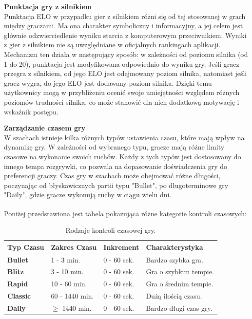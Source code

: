 \documentclass[12pt,a4paper]{article}
\begin{document}
\noindent \textbf{Punktacja gry z silnikiem}\\
Punktacja ELO w przypadku gier z silnikiem różni się od tej stosowanej w grach między graczami. Ma ona charakter symboliczny i informacyjny, a jej celem jest głównie odzwierciedlenie wyniku starcia z komputerowym przeciwnikiem. Wyniki z gier z silnikiem nie są uwzględniane w oficjalnych rankingach aplikacji. Mechanizm ten działa w następujący sposób: w zależności od poziomu silnika (od 1 do 20), punktacja jest modyfikowana odpowiednio do wyniku gry. Jeśli gracz przegra z silnikiem, od jego ELO jest odejmowany poziom silnika, natomiast jeśli gracz wygra, do jego ELO jest dodawany poziom silnika. Dzięki temu użytkownicy mogą w przybliżeniu ocenić swoje umiejętności względem różnych poziomów trudności silnika, co może stanowić dla nich dodatkową motywację i wskaźnik postępu.

\newpage

\noindent \textbf{Zarządzanie czasem gry}\\
W szachach istnieje kilka różnych typów ustawienia czasu, które mają wpływ na dynamikę gry. W zależności od wybranego typu, gracze mają różne limity czasowe na wykonanie swoich ruchów. Każdy z tych typów jest dostosowany do innego tempa rozgrywki, co pozwala na dopasowanie doświadczenia gry do preferencji graczy. Czas gry w szachach może obejmować różne długości, poczynając od błyskawicznych partii typu "Bullet", po długoterminowe gry "Daily", gdzie gracze wykonują ruchy w ciągu wielu dni.
\\\\
Poniżej przedstawiona jest tabela pokazująca różne kategorie kontroli czasowych:

\renewcommand{\arraystretch}{1.5}
\begin{table}[h!]
    \centering
    \begin{tabular}{|l|m{3cm}|m{3cm}|m{5cm}|}
        \hline
        \rowcolor{lightgray}
        \textbf{Typ Czasu} & \textbf{Zakres Czasu} & \textbf{Inkrement} & \textbf{Charakterystyka} \\ \hline
        \textbf{Bullet} & 1 - 3 min. & 0 - 60 sek. & Bardzo szybka gra. \\ \hline
        \textbf{Blitz} & 3 - 10 min. & 0 - 60 sek. & Gra o szybkim tempie. \\ \hline
        \textbf{Rapid} & 10 - 60 min. & 0 - 60 sek. & Gra o średnim tempie. \\ \hline
        \textbf{Classic} & 60 - 1440 min. & 0 - 60 sek. & Dużą ilością czasu. \\ \hline
        \textbf{Daily} & $\geq$ 1440 min. & 0 - 60 sek. & Bardzo długi czas gry. \\ \hline
    \end{tabular}
    \caption{Rodzaje kontroli czasowej gry.}
\end{table}
\vspace{0.5cm}
\end{document}
